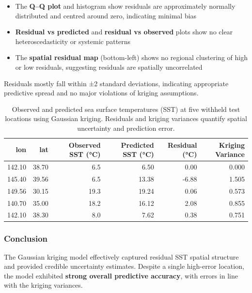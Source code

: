 \documentclass[
  11pt,
]{article}
\begin{document}
\begin{itemize}
\item
  The \textbf{Q--Q plot} and histogram show residuals are approximately
  normally distributed and centred around zero, indicating minimal bias
\item
  \textbf{Residual vs predicted} and \textbf{residual vs observed} plots
  show no clear heteroscedasticity or systemic patterns
\item
  The \textbf{spatial residual map} (bottom-left) shows no regional
  clustering of high or low residuals, suggesting residuals are
  spatially uncorrelated
\end{itemize}

Residuals mostly fall within ±2 standard deviations, indicating
appropriate predictive spread and no major violations of kriging
assumptions.

\begin{table}

\caption{Observed and predicted sea surface temperatures (SST) at five withheld
test locations using Gaussian kriging. Residuals and kriging variances
quantify spatial uncertainty and prediction error.}
\centering
\begin{tabular}[t]{rrrrrr}
\toprule
lon & lat & Observed SST (°C) & Predicted SST (°C) & Residual (°C) & Kriging Variance\\
\midrule
142.10 & 38.70 & 6.5 & 6.50 & 0.00 & 0.000\\
145.40 & 39.56 & 6.5 & 13.38 & -6.88 & 1.505\\
149.56 & 30.15 & 19.3 & 19.24 & 0.06 & 0.573\\
140.70 & 35.00 & 18.2 & 16.12 & 2.08 & 0.855\\
142.10 & 38.30 & 8.0 & 7.62 & 0.38 & 0.751\\
\bottomrule
\end{tabular}
\end{table}

\subsubsection{\texorpdfstring{\textbf{Conclusion}}{Conclusion}}\label{conclusion}

The Gaussian kriging model effectively captured residual SST spatial
structure and provided credible uncertainty estimates. Despite a single
high-error location, the model exhibited \textbf{strong overall
predictive accuracy}, with errors in line with the kriging variances.
\end{document}
